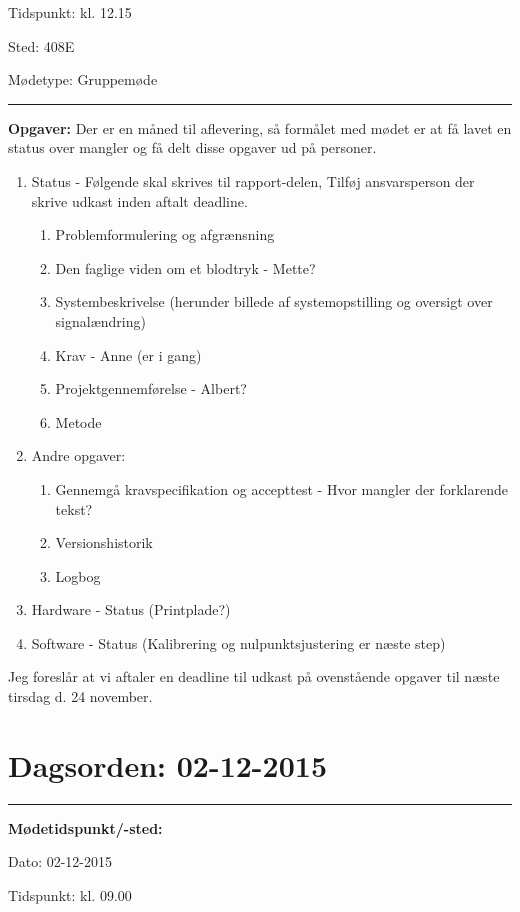 Tidspunkt: \tabto{7em} kl. 12.15

Sted: \tabto{7em} 408E

Mødetype: \tabto{7em} Gruppemøde \newline


\hrule
\textbf{Opgaver:} \newline
Der er en måned til aflevering, så formålet med mødet er at få lavet en status over mangler og få delt disse opgaver ud på personer.
\begin{enumerate}
\item Status - Følgende skal skrives til rapport-delen, Tilføj ansvarsperson der skrive udkast inden aftalt deadline.
\begin{enumerate}
\item Problemformulering og afgrænsning
\item Den faglige viden om et blodtryk - Mette?
\item Systembeskrivelse (herunder billede af systemopstilling og oversigt over signalændring)
\item Krav - Anne (er i gang)
\item Projektgennemførelse - Albert?
\item Metode
\end{enumerate}
\item Andre opgaver:
\begin{enumerate}
\item Gennemgå kravspecifikation og accepttest - Hvor mangler der forklarende tekst?
\item Versionshistorik
\item Logbog
\end{enumerate}
\item Hardware - Status (Printplade?)
\item Software - Status (Kalibrering og nulpunktsjustering er næste step)
\end{enumerate}

Jeg foreslår at vi aftaler en deadline til udkast på ovenstående opgaver til næste tirsdag d. 24 november.

\newpage
\section{Dagsorden: 02-12-2015}
\hrule



\textbf{Mødetidspunkt/-sted:} 

Dato: \tabto{7em} 02-12-2015

Tidspunkt: \tabto{7em} kl. 09.00

